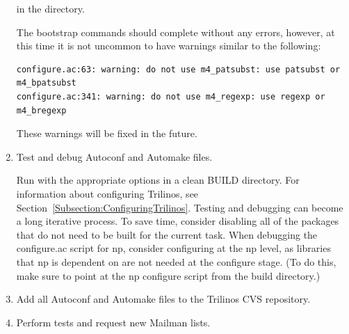 \documentclass[12pt,relax]{TrilinosDevGuide}
\begin{document}
\begin{enumerate}

in the  directory.

The bootstrap commands should complete without any errors, however, at this
time it is not uncommon to have warnings similar to the following:
\begin{verbatim}
configure.ac:63: warning: do not use m4_patsubst: use patsubst or m4_bpatsubst
configure.ac:341: warning: do not use m4_regexp: use regexp or m4_bregexp
\end{verbatim}
These warnings will be fixed in the future.

\item Test and debug Autoconf and Automake files.

Run  with the appropriate options in a clean BUILD 
directory.  For information about configuring Trilinos, see 
Section~\ref{Subsection:ConfiguringTrilinos}.  Testing and debugging can 
become a long iterative process.  To save time, consider disabling all of the 
packages that do not need to be built for the current task.  When debugging 
the configure.ac script for np, consider configuring at the np level, as 
libraries that np is dependent on are not needed at the configure stage.  
(To do this, make sure to point at the np configure script from the build 
directory.)

\item Add all Autoconf and Automake files to the Trilinos CVS repository.

\item Perform tests and request new Mailman lists.

\end{enumerate}
\end{document}
